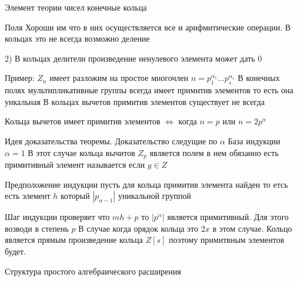 Элемент теории чисел конечные кольца

Поля Хороши им что в них осуществляется все и арифмитические операции. В
кольцах это не всегда возможно деление

2) В кольцах делители произведение ненулевого элемента может дать $0$

Пример: $Z_n$ имеет разложим на простое многочлен $n = p_1^{\alpha_1}\ldots
p_s^{\alpha_s}$ В конечных полях мультипликативные группы всегда имеет примитив
элементов то есть она ункальная В кольцах вычетов примитив элементов
существует не всегда

\begin{theorem}
  Кольца вычетов имеет примитив элементов $\Leftrightarrow$ когда $n=p$ или
  $n = 2p^{\alpha}$
\end{theorem}

Идея доказательства теоремы. Доказательство следущие по $\alpha$ База
индукции $\alpha = 1$ В этот случае кольца вычитов $Z_p$ является полем в нем
обязанно есть примитивный элемент называется если $g \in Z$

Предположение индукции  пусть для кольца примитив элемента найден то етсь есть
элемент $h$ который $|p_{\alpha-1}|$ уникальной группой

Шаг индукции проверяет что $mh + p$ то $|p^{\alpha}|$ является примитивный. Для
этого возводи в степень $p$ В случае когда орядок кольца это $2x$ в этом
случае. Кольцо является прямым произведение кольца $Z[s]$ поэтому примитвным
элементов будет.

\begin{title}
  {Структура простого алгебраического расширения}
\end{title}

